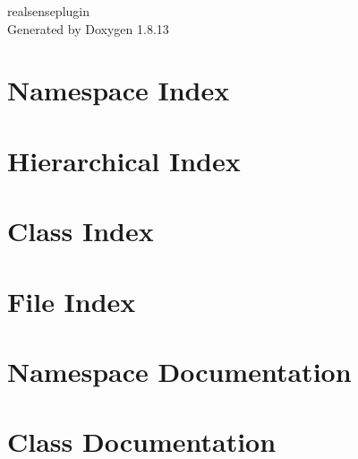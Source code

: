 \documentclass[twoside]{book}
\newcommand{\+}{\discretionary{\mbox{\scriptsize$\hookleftarrow$}}{}{}}
\newcommand{\clearemptydoublepage}{%
  \newpage{\pagestyle{empty}\cleardoublepage}%
}
\begin{document}
\hypersetup{pageanchor=false,
             bookmarksnumbered=true,
             pdfencoding=unicode
            }
\begin{titlepage}
\vspace*{7cm}
\begin{center}%
{\Large realsenseplugin }\\
\vspace*{1cm}
{\large Generated by Doxygen 1.8.13}\\
\end{center}
\end{titlepage}
\clearemptydoublepage
{}
\tableofcontents
\clearemptydoublepage
{}
\hypersetup{pageanchor=true}

\chapter{Namespace Index}

\chapter{Hierarchical Index}

\chapter{Class Index}

\chapter{File Index}

\chapter{Namespace Documentation}


\chapter{Class Documentation}














\end{document}
